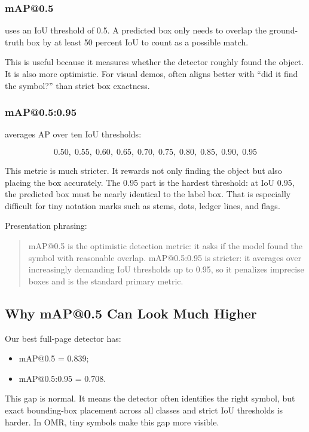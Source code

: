 \documentclass[11pt]{article}
\newcommand{\code}[1]{\texttt{\detokenize{#1}}}
\begin{document}
\subsubsection{mAP@0.5}

\code{mAP@0.5} uses an IoU threshold of 0.5. A predicted box only needs to overlap the ground-truth box by at least 50 percent IoU to count as a possible match.

This is useful because it measures whether the detector roughly found the object. It is also more optimistic. For visual demos, \code{mAP@0.5} often aligns better with ``did it find the symbol?'' than strict box exactness.

\subsubsection{mAP@0.5:0.95}

\code{mAP@0.5:0.95} averages AP over ten IoU thresholds:

\[
0.50,\;0.55,\;0.60,\;0.65,\;0.70,\;0.75,\;0.80,\;0.85,\;0.90,\;0.95
\]

This metric is much stricter. It rewards not only finding the object but also placing the box accurately. The 0.95 part is the hardest threshold: at IoU 0.95, the predicted box must be nearly identical to the label box. That is especially difficult for tiny notation marks such as stems, dots, ledger lines, and flags.

Presentation phrasing:

\begin{quote}
mAP@0.5 is the optimistic detection metric: it asks if the model found the symbol with reasonable overlap. mAP@0.5:0.95 is stricter: it averages over increasingly demanding IoU thresholds up to 0.95, so it penalizes imprecise boxes and is the standard primary metric.
\end{quote}

\subsection{Why mAP@0.5 Can Look Much Higher}

Our best full-page detector has:

\begin{itemize}
  \item mAP@0.5 = 0.839;
  \item mAP@0.5:0.95 = 0.708.
\end{itemize}

This gap is normal. It means the detector often identifies the right symbol, but exact bounding-box placement across all classes and strict IoU thresholds is harder. In OMR, tiny symbols make this gap more visible.
\end{document}
